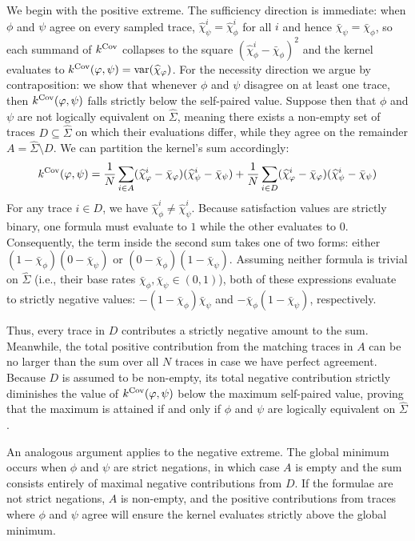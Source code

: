 \documentclass[titlepage,a4paper,11pt]{report}
\begin{document}
    We begin with the positive extreme. The sufficiency direction is immediate: when $\phi$ and $\psi$ agree on every sampled trace, $\widehat\chi^i_\psi = \widehat\chi^i_\phi$ for all $i$ and hence $\bar\chi_\psi = \bar\chi_\phi$, so each summand of $k^{\mathrm{Cov}}$ collapses to the square $(\widehat\chi^i_\phi - \bar\chi_\phi)^2$ and the kernel evaluates to $k^{\mathrm{Cov}}(\varphi, \psi) = \operatorname{var}(\widehat\chi_\varphi)$. For the necessity direction we argue by contraposition: we show that whenever $\phi$ and $\psi$ disagree on at least one trace, then $k^{\mathrm{Cov}}(\varphi, \psi)$ falls strictly below the self-paired value. Suppose then that $\phi$ and $\psi$ are not logically equivalent on $\widehat\Sigma$, meaning there exists a non-empty set of traces $D \subseteq \widehat\Sigma$ on which their evaluations differ, while they agree on the remainder $A = \widehat\Sigma \setminus D$. We can partition the kernel's sum accordingly:
    \begin{equation}
        k^{\mathrm{Cov}}(\varphi, \psi) = \frac{1}{N} \sum_{i \in A} (\widehat{\chi}^i_\varphi - \bar{\chi}_\varphi) (\widehat{\chi}^i_\psi - \bar{\chi}_\psi) + \frac{1}{N} \sum_{i \in D} (\widehat{\chi}^i_\varphi - \bar{\chi}_\varphi) (\widehat{\chi}^i_\psi - \bar{\chi}_\psi)
    \end{equation}
    For any trace $i \in D$, we have $\widehat\chi^i_\phi \neq \widehat\chi^i_\psi$. Because satisfaction values are strictly binary, one formula must evaluate to $1$ while the other evaluates to $0$. Consequently, the term inside the second sum takes one of two forms: either $(1 - \bar\chi_\phi)(0 - \bar\chi_\psi)$ or $(0 - \bar\chi_\phi)(1 - \bar\chi_\psi)$. Assuming neither formula is trivial on $\widehat\Sigma$ (i.e., their base rates $\bar\chi_\phi, \bar\chi_\psi \in (0, 1)$), both of these expressions evaluate to strictly negative values: $-(1 - \bar\chi_\phi)\bar\chi_\psi$ and $-\bar\chi_\phi(1 - \bar\chi_\psi)$, respectively. 
    
    Thus, every trace in $D$ contributes a strictly negative amount to the sum. Meanwhile, the total positive contribution from the matching traces in $A$ can be no larger than the sum over all $N$ traces in case we have perfect agreement. Because $D$ is assumed to be non-empty, its total negative contribution strictly diminishes the value of $k^{\mathrm{Cov}}(\varphi, \psi)$ below the maximum self-paired value, proving that the maximum is attained if and only if $\phi$ and $\psi$ are logically equivalent on $\widehat\Sigma$.
    
    An analogous argument applies to the negative extreme. The global minimum occurs when $\phi$ and $\psi$ are strict negations, in which case $A$ is empty and the sum consists entirely of maximal negative contributions from $D$. If the formulae are not strict negations, $A$ is non-empty, and the positive contributions from traces where $\phi$ and $\psi$ agree will ensure the kernel evaluates strictly above the global minimum.
\end{document}
